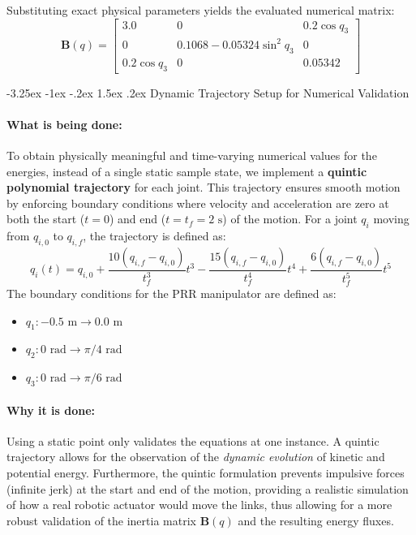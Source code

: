 \documentclass[11pt, a4paper]{article}
\makeatletter
\renewcommand{\subsection}{\@startsection{subsection}{2}{\z@}%
    {-3.25ex \@plus -1ex \@minus -.2ex}%
    {1.5ex \@plus .2ex}%
    {\normalfont\large\bfseries\color{brandaccent}}}
\makeatother
\begin{document}
Substituting exact physical parameters yields the evaluated numerical matrix:
\begin{equation}
\mathbf{B}(q) = \begin{bmatrix}
3.0 & 0 & 0.2\cos q_3 \\
0 & 0.1068 - 0.05324\sin^2 q_3 & 0 \\
0.2\cos q_3 & 0 & 0.05342
\end{bmatrix}
\end{equation}

\subsection{Dynamic Trajectory Setup for Numerical Validation}
\paragraph{What is being done:}
To obtain physically meaningful and time-varying numerical values for the energies, instead of a single static sample state, we implement a \textbf{quintic polynomial trajectory} for each joint. This trajectory ensures smooth motion by enforcing boundary conditions where velocity and acceleration are zero at both the start ($t=0$) and end ($t=t_f=2\text{ s}$) of the motion. For a joint $q_i$ moving from $q_{i,0}$ to $q_{i,f}$, the trajectory is defined as:
\begin{equation}
    q_i(t) = q_{i,0} + \frac{10(q_{i,f}-q_{i,0})}{t_f^3}t^3 - \frac{15(q_{i,f}-q_{i,0})}{t_f^4}t^4 + \frac{6(q_{i,f}-q_{i,0})}{t_f^5}t^5
\end{equation}
The boundary conditions for the PRR manipulator are defined as:
\begin{itemize}[leftmargin=1.5em]
    \item $q_1: -0.5\text{ m} \to 0.0\text{ m}$
    \item $q_2: 0\text{ rad} \to \pi/4\text{ rad}$
    \item $q_3: 0\text{ rad} \to \pi/6\text{ rad}$
\end{itemize}

\paragraph{Why it is done:}
Using a static point only validates the equations at one instance. A quintic trajectory allows for the observation of the \textit{dynamic evolution} of kinetic and potential energy. Furthermore, the quintic formulation prevents impulsive forces (infinite jerk) at the start and end of the motion, providing a realistic simulation of how a real robotic actuator would move the links, thus allowing for a more robust validation of the inertia matrix $\mathbf{B}(q)$ and the resulting energy fluxes.
\end{document}
